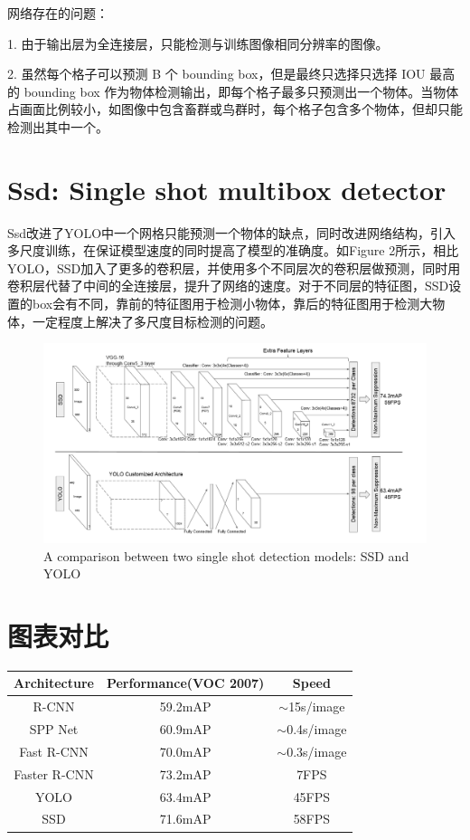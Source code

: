 \documentclass[12pt,onecolumn]{article}
\begin{document}
    网络存在的问题：\par
    1. 由于输出层为全连接层，只能检测与训练图像相同分辨率的图像。\par
    2. 虽然每个格子可以预测 B 个 bounding box，但是最终只选择只选择 IOU 最高的 bounding box 作为物体检测输出，即每个格子最多只预测出一个物体。当物体占画面比例较小，如图像中包含畜群或鸟群时，每个格子包含多个物体，但却只能检测出其中一个。
    
    \section{Ssd: Single shot multibox detector\cite{liu2016ssd}}
    Ssd改进了YOLO中一个网格只能预测一个物体的缺点，同时改进网络结构，引入多尺度训练，在保证模型速度的同时提高了模型的准确度。如Figure 2所示，相比YOLO，SSD加入了更多的卷积层，并使用多个不同层次的卷积层做预测，同时用卷积层代替了中间的全连接层，提升了网络的速度。对于不同层的特征图，SSD设置的box会有不同，靠前的特征图用于检测小物体，靠后的特征图用于检测大物体，一定程度上解决了多尺度目标检测的问题。
    \begin{figure}[ht]
        \centering
        \includegraphics[width=\linewidth]{figure/ssd.png}
        \caption{A comparison between two single shot detection models: SSD and YOLO}
    \end{figure}


    \section{图表对比}
    \begin{table}[h]
    \begin{tabular}{|c|c|c|}
        \hline
        Architecture & Performance(VOC 2007) & Speed            \\ \hline
        R-CNN        & 59.2mAP               & $\sim$15s/image  \\ \hline
        SPP Net      & 60.9mAP               & $\sim$0.4s/image \\ \hline
        Fast R-CNN   & 70.0mAP               & $\sim$0.3s/image \\ \hline
        Faster R-CNN & 73.2mAP               & 7FPS             \\ \hline
        YOLO         & 63.4mAP               & 45FPS            \\ \hline
        SSD          & 71.6mAP               & 58FPS            \\ \hline
    \end{tabular}
    \end{table}


    {\small
     
    
    }
\end{document}
